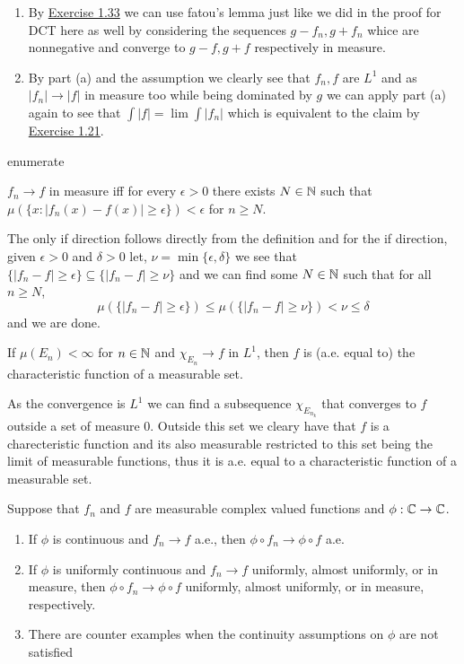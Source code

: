 \documentclass[12pt,a4paper]{article}
\begin{document}
\begin{solution}
	\begin{enumerate}[label=\alph*.]
		\item By \hyperref[prob:2-33]{Exercise 1.33} we can use fatou's lemma just like we did in the proof for DCT here as well by considering the sequences $g-f_n,g+f_n$ whice are nonnegative and converge to $g-f,g+f$ respectively in measure. 
		\item By part (a) and the assumption we clearly see that $f_n,f$ are $L^1$ and as $|f_n|\to|f|$ in measure too while being dominated by $g$ we can apply part (a) again to see that $\int |f|=\lim\int |f_n|$ which is equivalent to the claim by \hyperref[prob:2-21]{Exercise 1.21}.
	\end{enumerate}
	enumerate
\end{solution}
\begin{problem}\label{prob:2-35}
$f_n \to f$ in measure iff for every $\epsilon > 0$ there exists $N \in \mathbb{N}$ such that $\mu(\{x : |f_n(x) - f(x)| \ge \epsilon\}) < \epsilon$ for $n \ge N$.
\end{problem}
\begin{solution}
	The only if direction follows directly from the definition and for the if direction, given $\epsilon>0$ and $\delta>0$ let, $\nu=\min\{\epsilon,\delta\}$ we see that $\{|f_n-f|\geq\epsilon\}\subseteq\{|f_n-f|\geq\nu\}$ and we can find some $N\in\mathbb{N}$ such that for all $n\geq N$,
\[
	\mu(\{|f_n-f|\geq\epsilon\})\leq\mu(\{|f_n-f|\geq\nu\})<\nu\leq\delta
\]
and we are done. 
\end{solution}
\begin{problem}\label{prob:2-36}
If $\mu(E_n) < \infty$ for $n \in \mathbb{N}$ and $\chi_{E_n} \to f$ in $L^1$, then $f$ is (a.e. equal to) the characteristic function of a measurable set.
\end{problem}
\begin{solution}
	As the convergence is $L^1$ we can find a subsequence $\chi_{E_{n_k}}$ that converges to $f$ outside a set of measure $0$. 
Outside this set we cleary have that $f$ is a charecteristic function and its also measurable restricted to this set being the limit of measurable functions, thus it is a.e. equal to a characteristic function of a measurable set.
\end{solution}
\begin{problem}\label{prob:2-37}
Suppose that $f_n$ and $f$ are measurable complex valued functions and $\phi:\mathbb{C}\to\mathbb{C}$.
\begin{enumerate}[label=\alph*.]
	\item If $\phi$ is continuous and $f_n\to f$ a.e., then $\phi\circ f_n\to\phi\circ f$ a.e.
	\item If $\phi$ is uniformly continuous and $f_n\to f$ uniformly, almost uniformly, or in measure, then $\phi\circ f_n\to\phi\circ f$ uniformly, almost uniformly, or in measure, 
respectively. 
	\item There are counter examples when the continuity assumptions on $\phi$ are not satisfied
\end{enumerate}
\end{problem}
\end{document}
